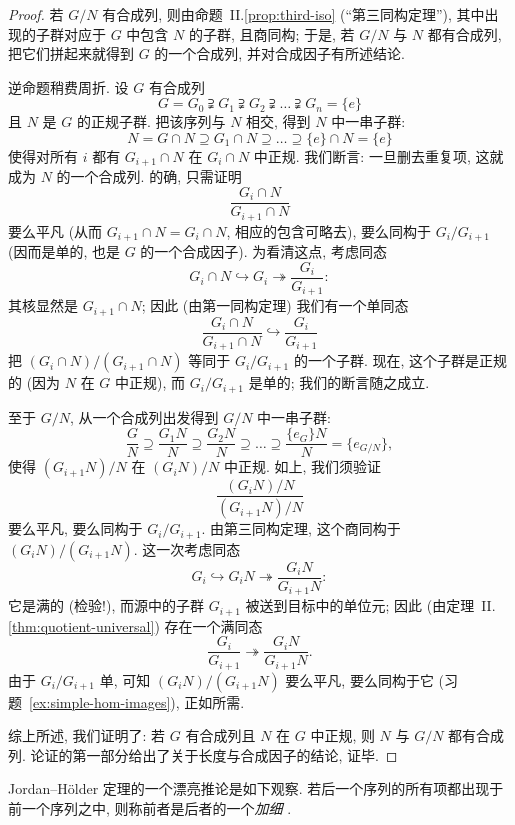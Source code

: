 \begin{proof}
若 $G/N$ 有合成列, 则由命题~II.\ref{prop:third-iso} (``第三同构定理''), 其中出现的子群对应于 $G$ 中包含 $N$ 的子群, 且商同构; 于是, 若 $G/N$ 与 $N$ 都有合成列, 把它们拼起来就得到 $G$ 的一个合成列, 并对合成因子有所述结论.

逆命题稍费周折. 设 $G$ 有合成列
\[
G = G_0 \supsetneqq G_1 \supsetneqq G_2 \supsetneqq \dots \supsetneqq G_n = \{e\}
\]
且 $N$ 是 $G$ 的正规子群. 把该序列与 $N$ 相交, 得到 $N$ 中一串子群:
\[
N = G \cap N \supseteq G_1 \cap N \supseteq \dots \supseteq \{e\} \cap N = \{e\}
\]
使得对所有 $i$ 都有 $G_{i+1} \cap N$ 在 $G_i \cap N$ 中正规. 我们断言: 一旦删去重复项, 这就成为 $N$ 的一个合成列. 的确, 只需证明
\[
\frac{G_i \cap N}{G_{i+1} \cap N}
\]
要么平凡 (从而 $G_{i+1} \cap N = G_i \cap N$, 相应的包含可略去), 要么同构于 $G_i/G_{i+1}$ (因而是单的, 也是 $G$ 的一个合成因子). 为看清这点, 考虑同态
\[
G_i \cap N \hookrightarrow G_i \twoheadrightarrow \frac{G_i}{G_{i+1}}:
\]
其核显然是 $G_{i+1} \cap N$; 因此 (由第一同构定理) 我们有一个单同态
\[
\frac{G_i \cap N}{G_{i+1} \cap N} \hookrightarrow \frac{G_i}{G_{i+1}}
\]
把 $(G_i \cap N)/(G_{i+1} \cap N)$ 等同于 $G_i/G_{i+1}$ 的一个子群. 现在, 这个子群是正规的 (因为 $N$ 在 $G$ 中正规), 而 $G_i/G_{i+1}$ 是单的; 我们的断言随之成立.

至于 $G/N$, 从一个合成列出发得到 $G/N$ 中一串子群:
\[
\frac{G}{N} \supseteq \frac{G_1N}{N} \supseteq \frac{G_2N}{N} \supseteq \dots \supseteq \frac{\{e_G\}N}{N} = \{e_{G/N}\},
\]
使得 $(G_{i+1}N)/N$ 在 $(G_iN)/N$ 中正规. 如上, 我们须验证
\[
\frac{(G_iN)/N}{(G_{i+1}N)/N}
\]
要么平凡, 要么同构于 $G_i/G_{i+1}$. 由第三同构定理, 这个商同构于 $(G_iN)/(G_{i+1}N)$. 这一次考虑同态
\[
G_i \hookrightarrow G_iN \twoheadrightarrow \frac{G_iN}{G_{i+1}N}:
\]
它是满的 (检验!), 而源中的子群 $G_{i+1}$ 被送到目标中的单位元; 因此 (由定理~II.\ref{thm:quotient-universal}) 存在一个满同态
\[
\frac{G_i}{G_{i+1}} \twoheadrightarrow \frac{G_iN}{G_{i+1}N}.
\]
由于 $G_i/G_{i+1}$ 单, 可知 $(G_iN)/(G_{i+1}N)$ 要么平凡, 要么同构于它 (习题~\ref{ex:simple-hom-images}), 正如所需.

综上所述, 我们证明了: 若 $G$ 有合成列且 $N$ 在 $G$ 中正规, 则 $N$ 与 $G/N$ 都有合成列. 论证的第一部分给出了关于长度与合成因子的结论, 证毕.
\end{proof}

Jordan--H\"older 定理的一个漂亮推论是如下观察. 若后一个序列的所有项都出现于前一个序列之中, 则称前者是后者的一个\emph{加细}%
%
.

